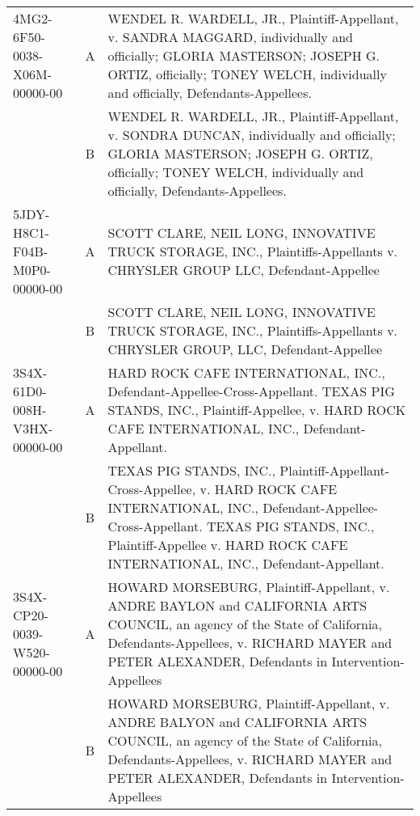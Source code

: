 \documentclass[10pt, letterpaper]{article}
\begin{document}
\begin{spacing}{1.0}
\begin{small}
\begin{longtable}[H]{lcp{4in}}
    4MG2-6F50-0038-X06M-00000-00 & A & WENDEL R. WARDELL, JR., Plaintiff-Appellant, v. SANDRA MAGGARD, individually and officially; GLORIA MASTERSON; JOSEPH G. ORTIZ, officially; TONEY WELCH, individually and officially, Defendants-Appellees.\\[4pt] & B & WENDEL R. WARDELL, JR., Plaintiff-Appellant, v. SONDRA DUNCAN, individually and officially; GLORIA MASTERSON; JOSEPH G. ORTIZ, officially; TONEY WELCH, individually and officially, Defendants-Appellees.\\[6pt]
    5JDY-H8C1-F04B-M0P0-00000-00 & A & SCOTT CLARE, NEIL LONG, INNOVATIVE TRUCK STORAGE, INC., Plaintiffs-Appellants v. CHRYSLER GROUP LLC, Defendant-Appellee\\[4pt] & B & SCOTT CLARE, NEIL LONG, INNOVATIVE TRUCK STORAGE, INC., Plaintiffs-Appellants v. CHRYSLER GROUP, LLC, Defendant-Appellee\\[6pt]
    3S4X-61D0-008H-V3HX-00000-00 & A & HARD ROCK CAFE INTERNATIONAL, INC., Defendant-Appellee-Cross-Appellant. TEXAS PIG STANDS, INC., Plaintiff-Appellee, v. HARD ROCK CAFE INTERNATIONAL, INC., Defendant-Appellant.\\[4pt] & B & TEXAS PIG STANDS, INC., Plaintiff-Appellant-Cross-Appellee, v. HARD ROCK CAFE INTERNATIONAL, INC., Defendant-Appellee-Cross-Appellant. TEXAS PIG STANDS, INC., Plaintiff-Appellee v. HARD ROCK CAFE INTERNATIONAL, INC., Defendant-Appellant.\\[6pt]
    3S4X-CP20-0039-W520-00000-00 & A & HOWARD MORSEBURG, Plaintiff-Appellant, v. ANDRE BAYLON and CALIFORNIA ARTS COUNCIL, an agency of the State of California, Defendants-Appellees, v. RICHARD MAYER and PETER ALEXANDER, Defendants in Intervention-Appellees\\[4pt] & B & HOWARD MORSEBURG, Plaintiff-Appellant, v. ANDRE BALYON and CALIFORNIA ARTS COUNCIL, an agency of the State of California, Defendants-Appellees, v. RICHARD MAYER and PETER ALEXANDER, Defendants in Intervention-Appellees\\[6pt]

\end{longtable}
\end{small}
\end{spacing}
\end{document}
